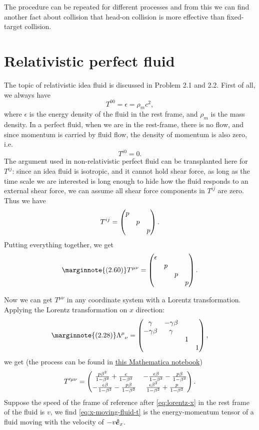 \documentclass[hyperref, a4paper]{article}
\begin{document}
The procedure can be repeated for different processes and from this we can find another fact about collision that 
head-on collision is more effective than fixed-target collision.

\section{Relativistic perfect fluid}

The topic of relativistic idea fluid is discussed in Problem 2.1 and 2.2. 
First of all, we always have 
\[
    T^{00} = \epsilon = \rho_m c^2,
\]
where $\epsilon$ is the energy density of the fluid in the rest frame, and $\rho_m$ is the mass density.
In a perfect fluid, when we are in the rest-frame, there is no flow, and since momentum is carried by fluid flow,
the density of momentum is also zero, i.e.
\[
    T^{i0} = 0.
\]
The argument used in non-relativistic perfect fluid can be transplanted here for $T^{ij}$: since an idea fluid 
is isotropic, and it cannot hold shear force, as long as the time scale we are interested is long enough to 
hide how the fluid responds to an external shear force, we can assume all shear force components in $T^{ij}$
are zero. Thus we have 
\[
    T^{ij} = \pmqty{\dmat{p, p, p}}.
\]
Putting everything together, we get 
\begin{equation} \marginnote{(2.60)}
    T^{\mu \nu} = \pmqty{\dmat{\epsilon, p, p, p}}.
    \label{eq:rest-frame-perfect-fluid-t}
\end{equation}

Now we can get $T^{\mu \nu}$ in any coordinate system with a Lorentz transformation.
Applying the Lorentz transformation on $x$ direction:
\begin{equation} \marginnote{(2.28)}
    \Lambda\indices{^\mu_\nu} = \pmqty{\dmat{\gamma & - \gamma \beta \\ - \gamma \beta & \gamma, 1, 1}},
    \label{eq:lorentz-x}
\end{equation}
we get (the process can be found in \href{relativistic-ideal-fluid.nb}{this Mathematica notebook})
\begin{equation}
    T'^{\mu \nu} = \pmqty{\frac{p \beta ^2}{1-\beta ^2}+\frac{\epsilon }{1-\beta ^2} & -\frac{\epsilon  \beta }{1-\beta
    ^2}-\frac{p \beta }{1-\beta ^2} \\
  -\frac{\epsilon  \beta }{1-\beta ^2}-\frac{p \beta }{1-\beta ^2} & \frac{\epsilon  \beta ^2}{1-\beta
    ^2}+\frac{p}{1-\beta ^2} }.
    \label{eq:x-moving-fluid-t}
\end{equation}
Suppose the speed of the frame of reference after \eqref{eq:lorentz-x} in the rest frame of the fluid is $v$,
we find \eqref{eq:x-moving-fluid-t} is the energy-momentum tensor of a fluid moving with the velocity of 
$- v \vu*{e}_x$.  
\end{document}

